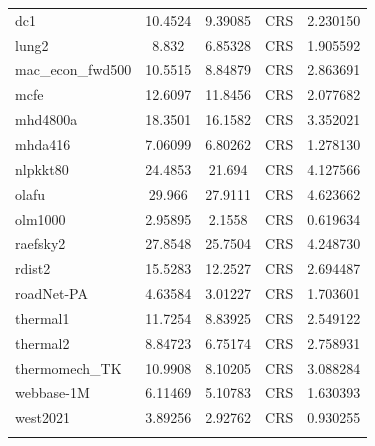 \documentclass[12pt,oneside]{book} %
\begin{document}
\begin{longtable}{lcccr}
    dc1               & 10.4524      & 9.39085          & CRS                     & 2.230150         \\
    lung2             & 8.832        & 6.85328          & CRS                     & 1.905592         \\
    mac\_econ\_fwd500 & 10.5515      & 8.84879          & CRS                     & 2.863691         \\
    mcfe              & 12.6097      & 11.8456          & CRS                     & 2.077682         \\
    mhd4800a          & 18.3501      & 16.1582          & CRS                     & 3.352021         \\
    mhda416           & 7.06099      & 6.80262          & CRS                     & 1.278130         \\
    nlpkkt80          & 24.4853      & 21.694           & CRS                     & 4.127566         \\
    olafu             & 29.966       & 27.9111          & CRS                     & 4.623662         \\
    olm1000           & 2.95895      & 2.1558           & CRS                     & 0.619634         \\
    raefsky2          & 27.8548      & 25.7504          & CRS                     & 4.248730         \\
    rdist2            & 15.5283      & 12.2527          & CRS                     & 2.694487         \\
    roadNet-PA        & 4.63584      & 3.01227          & CRS                     & 1.703601         \\
    thermal1          & 11.7254      & 8.83925          & CRS                     & 2.549122         \\
    thermal2          & 8.84723      & 6.75174          & CRS                     & 2.758931         \\
    thermomech\_TK    & 10.9908      & 8.10205          & CRS                     & 3.088284         \\
    webbase-1M        & 6.11469      & 5.10783          & CRS                     & 1.630393         \\
    west2021          & 3.89256      & 2.92762          & CRS                     & 0.930255         \\                                                                               \\
\end{longtable}
\end{document}
